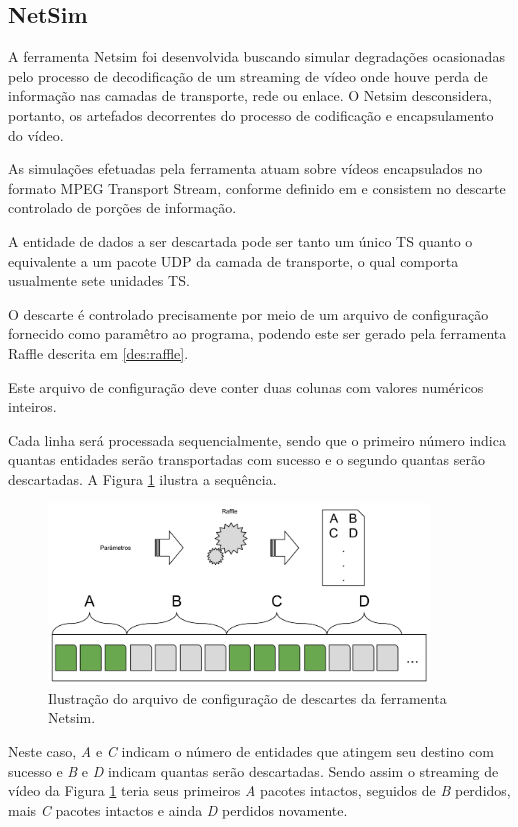 \subsection{NetSim}

A ferramenta Netsim foi desenvolvida buscando simular degradações ocasionadas pelo processo de decodificação de um streaming de vídeo onde houve perda de informação nas camadas de transporte, rede ou enlace. O Netsim desconsidera, portanto, os artefados decorrentes do processo de codificação e encapsulamento do vídeo.

As simulações efetuadas pela ferramenta atuam sobre vídeos encapsulados no formato MPEG Transport Stream, conforme definido em \cite{ituh222} e consistem no descarte controlado de porções de informação.

A entidade de dados a ser descartada pode ser tanto um único TS quanto o equivalente a um pacote UDP da camada de transporte, o qual comporta usualmente sete unidades TS.

O descarte é controlado precisamente por meio de um arquivo de configuração fornecido como paramêtro ao programa, podendo este ser gerado pela ferramenta Raffle descrita em \ref{des:raffle}.

Este arquivo de configuração deve conter duas colunas com valores numéricos inteiros. 

Cada linha será processada sequencialmente, sendo que o primeiro número indica quantas entidades serão transportadas com sucesso e o segundo quantas serão descartadas. 
A Figura \ref{fig:netsim} ilustra a sequência.

\begin{figure}[!htb]
	\centering
	\includegraphics[width=0.9\textwidth]{./imgs/netsim.png}
	\caption{Ilustração do arquivo de configuração de descartes da ferramenta Netsim.}
	\label{fig:netsim}
\end{figure}

Neste caso, \emph{A} e \emph{C} indicam o número de entidades que atingem seu destino com sucesso e \emph{B} e \emph{D} indicam quantas serão descartadas. 
Sendo assim o streaming de vídeo da Figura \ref{fig:netsim}  teria seus primeiros \emph{A} pacotes intactos, seguidos de \emph{B} perdidos, mais \emph{C} pacotes intactos e ainda \emph{D} perdidos novamente.

